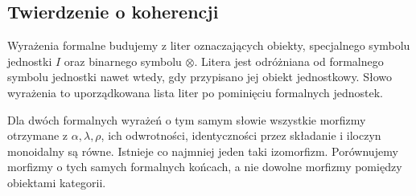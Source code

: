 \subsection{Twierdzenie o koherencji}
Wyrażenia formalne budujemy z liter oznaczających obiekty, specjalnego symbolu jednostki $I$ oraz binarnego symbolu $\otimes$. Litera jest odróżniana od formalnego symbolu jednostki nawet wtedy, gdy przypisano jej obiekt jednostkowy. Słowo wyrażenia to uporządkowana lista liter po pominięciu formalnych jednostek.

\begin{twierdzenie}\label{cat:thm:mac-lane-coherence}
Dla dwóch formalnych wyrażeń o tym samym słowie wszystkie morfizmy otrzymane z $\alpha,\lambda,\rho$, ich odwrotności, identyczności przez składanie i iloczyn monoidalny są równe. Istnieje co najmniej jeden taki izomorfizm. Porównujemy morfizmy o tych samych formalnych końcach, a nie dowolne morfizmy pomiędzy obiektami kategorii.
\end{twierdzenie}
